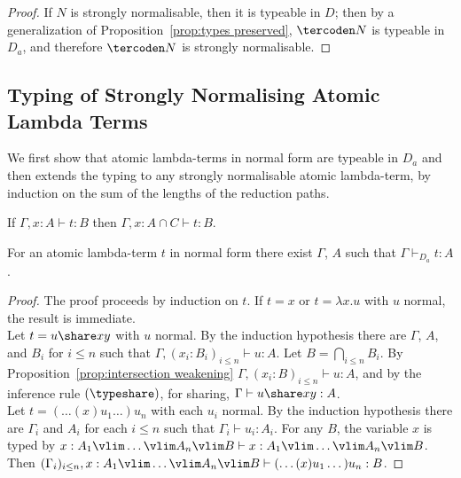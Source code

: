 \begin{proof}
If $N$ is strongly normalisable, then it is typeable in $D$; then by a generalization of Proposition~\ref{prop:types preserved}, $\tercoden N$ is typeable in $D_a$, and therefore  $\tercoden N$ is strongly normalisable.
\end{proof}


\subsection{Typing of Strongly Normalising Atomic Lambda Terms}

We first show that atomic lambda-terms in normal form are typeable in $D_a$ and then extends the typing to any strongly normalisable  atomic lambda-term, by induction on the sum of the lengths of the reduction paths.

\begin{ALproposition}
\label{prop:intersection weakening}
If $\Gamma, x:A\vdash t:B$ then $\Gamma,x:A\cap C\vdash t:B$.
\end{ALproposition}


% 

\begin{ALproposition}
\label{prop:typable normal form}
For an atomic lambda-term $t$ in normal form there exist $\Gamma$, $A$ such that $\Gamma\vdash_{D_a} t:A$.
\end{ALproposition}


\begin{proof}
The proof proceeds by induction on $t$. If  $t=x$ or  $t=\lambda x.u$ with $u$ normal, the result is immediate.
\\
Let $t=u\share xy$ with $u$ normal.
%
By the induction hypothesis there are $\Gamma$, $A$, and $B_i$ for $i\leq n$ such that $\Gamma,(x_i:B_i)_{i\leq n}\vdash u:A$.
%
Let $B=\bigcap_{i\leq n}B_i$.
%
By Proposition~\ref{prop:intersection weakening} $\Gamma,(x_i:B)_{i\leq n}\vdash u:A$, and by the inference rule $(\typeshare)$, for sharing, $\Gamma\vdash u\share xy:A$.
\\
Let $t=(\dotso(x)u_1\dotso )u_n$ with each $u_i$ normal.
%
By the induction hypothesis there are $\Gamma_i$ and $A_i$ for each $i\leq n$ such that $\Gamma_i \vdash u_i: A_i$.
%
For any $B$, the variable $x$ is typed by $x: A_1 \vlim \dotso \vlim A_n \vlim B \vdash x: A_1 \vlim \dotso \vlim A_n \vlim B$.
%
Then $(\Gamma_i)_{i\leq n},x: A_1 \vlim \dotso \vlim A_n \vlim B \vdash (\dotso(x)u_1\dotso )u_n: B$.

\end{proof}

